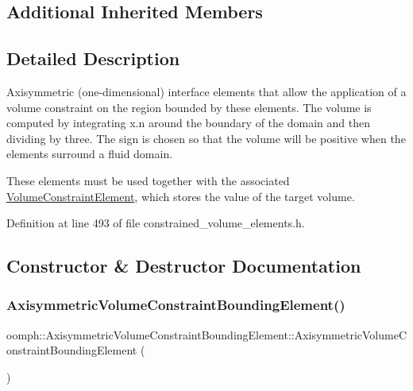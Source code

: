 \subsection*{Additional Inherited Members}


\subsection{Detailed Description}
Axisymmetric (one-\/dimensional) interface elements that allow the application of a volume constraint on the region bounded by these elements. The volume is computed by integrating x.\+n around the boundary of the domain and then dividing by three. The sign is chosen so that the volume will be positive when the elements surround a fluid domain.

These elements must be used together with the associated \hyperlink{classoomph_1_1VolumeConstraintElement}{Volume\+Constraint\+Element}, which stores the value of the target volume. 

Definition at line 493 of file constrained\+\_\+volume\+\_\+elements.\+h.



\subsection{Constructor \& Destructor Documentation}
\mbox{\label{classoomph_1_1AxisymmetricVolumeConstraintBoundingElement_a716ae91b7c11f6d71c474bec6f6d6d24}} 
\subsubsection{\texorpdfstring{Axisymmetric\+Volume\+Constraint\+Bounding\+Element()}{AxisymmetricVolumeConstraintBoundingElement()}}
{\footnotesize\ttfamily oomph\+::\+Axisymmetric\+Volume\+Constraint\+Bounding\+Element\+::\+Axisymmetric\+Volume\+Constraint\+Bounding\+Element (\begin{DoxyParamCaption}{ }\end{DoxyParamCaption})\hspace{0.3cm}{\ttfamily [inline]}}



